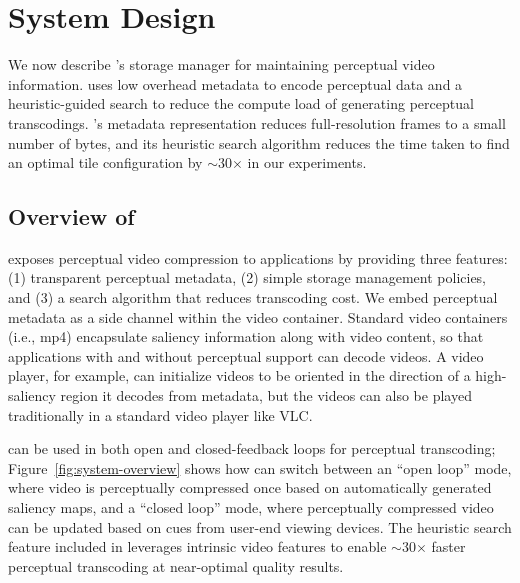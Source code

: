 
\section{\nameStore System Design}
\label{sec:system}


We now describe \name's storage manager for maintaining perceptual video information.
\nameStore uses low overhead metadata to encode perceptual data and a heuristic-guided search to reduce the compute load of generating perceptual transcodings.
\nameStore's metadata representation reduces full-resolution frames to a small number of bytes, and its heuristic search algorithm reduces the time taken to find an optimal tile configuration by $\sim$30$\times$ in our experiments.

\subsection{Overview of \nameStore}
\label{sec:system:goals}

\nameStore exposes perceptual video compression to applications by providing three features: (1) transparent perceptual metadata, (2) simple storage management policies, and (3) a search algorithm that reduces transcoding cost.
We embed perceptual metadata as a side channel within the video container.
Standard video containers (i.e., mp4) encapsulate saliency information along with video content, so that applications with and without perceptual support can decode \name videos.
A \threesixty video player, for example, can initialize videos to be oriented in the direction of a high-saliency region it decodes from \name metadata, but the videos can also be played traditionally in a standard video player like VLC. %

\systemOverviewFigure

\nameStore can be used in both open and closed-feedback loops for perceptual transcoding; Figure~\ref{fig:system-overview} shows how \nameStore can switch between an ``open loop'' mode, where video is perceptually compressed once based on automatically generated saliency maps, and a ``closed loop'' mode, where perceptually compressed video can be updated based on cues from user-end viewing devices.
The heuristic search feature included in \nameStore leverages intrinsic video features to enable $\sim$30$\times$ faster perceptual transcoding at near-optimal quality results.

